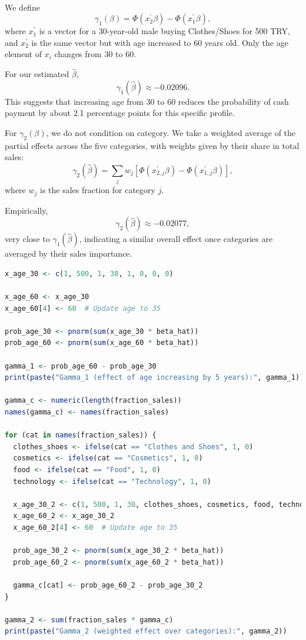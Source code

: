\documentclass[a4paper,12pt]{article} %
\theoremstyle{nonitalic}
\newenvironment{solution}[1]
  {\renewcommand\theinnercustomsol{#1}\innercustomsol}
  {\endinnercustomsol}
\newcounter{solutionctr}[section]
\renewcommand{\thesolutionctr}{(\alph{solutionctr})}
\newenvironment{autosolution}
  {\stepcounter{solutionctr}\begin{solution}{\thesolutionctr}}
  {\end{solution}}
\begin{document}
\begin{autosolution}
    \

    We define
    \[
    \gamma_1(\beta) = \Phi(x_2^{\prime} \beta) - \Phi(x_1^{\prime} \beta),
    \]
    where $x_1^{\prime} $ is a vector for a 30-year-old male buying Clothes/Shoes for 500 TRY, 
    and $x_2^{\prime}$ is the same vector but with age increased to 60 years old. 
    Only the age element of $x_i$ changes from 30 to 60.

    For our estimated $\hat{\beta}$,
    \[
    \gamma_1(\hat{\beta}) \approx -0.02096.
    \]
    This suggests that increasing age from 30 to 60 reduces the probability of cash payment by about 2.1 percentage points for this specific profile.

    For $\gamma_2(\beta)$, we do not condition on category. We take a weighted average of the partial effects across the five categories, with weights given by their share in total sales:
    \[
    \gamma_2(\hat{\beta}) = \sum_{j} w_j \left[\Phi(x_{2,j}^{\prime} \beta) - \Phi(x_{1,j}^{\prime} \beta)\right],
    \]
    where $w_j$ is the sales fraction for category $j$.

    Empirically,
    \[
    \gamma_2(\hat{\beta}) \approx -0.02077,
    \]
    very close to $\gamma_1(\hat{\beta})$, indicating a similar overall effect once categories are averaged by their sales importance.

    \begin{lstlisting}[language=R]
x_age_30 <- c(1, 500, 1, 30, 1, 0, 0, 0)

x_age_60 <- x_age_30
x_age_60[4] <- 60  # Update age to 35

prob_age_30 <- pnorm(sum(x_age_30 * beta_hat))
prob_age_60 <- pnorm(sum(x_age_60 * beta_hat))

gamma_1 <- prob_age_60 - prob_age_30
print(paste("Gamma_1 (effect of age increasing by 5 years):", gamma_1))

gamma_c <- numeric(length(fraction_sales))
names(gamma_c) <- names(fraction_sales)

for (cat in names(fraction_sales)) {
  clothes_shoes <- ifelse(cat == "Clothes and Shoes", 1, 0)
  cosmetics <- ifelse(cat == "Cosmetics", 1, 0)
  food <- ifelse(cat == "Food", 1, 0)
  technology <- ifelse(cat == "Technology", 1, 0)
  
  x_age_30_2 <- c(1, 500, 1, 30, clothes_shoes, cosmetics, food, technology)
  x_age_60_2 <- x_age_30_2
  x_age_60_2[4] <- 60  # Update age to 35
  
  prob_age_30_2 <- pnorm(sum(x_age_30_2 * beta_hat))
  prob_age_60_2 <- pnorm(sum(x_age_60_2 * beta_hat))
  
  gamma_c[cat] <- prob_age_60_2 - prob_age_30_2
}

gamma_2 <- sum(fraction_sales * gamma_c)
print(paste("Gamma_2 (weighted effect over categories):", gamma_2))        
    \end{lstlisting}
\end{autosolution}
\end{document}
